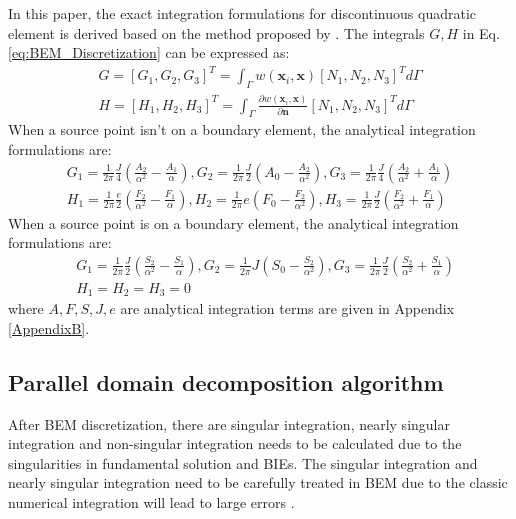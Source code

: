 \documentclass[num-refs]{wiley-networks}
\begin{document}
In this paper, the exact integration formulations for discontinuous quadratic element is derived based on the method proposed by \cite{zhang2003exact}. The integrals $G,H$ in Eq.\eqref{eq:BEM_Discretization} can be expressed as:
\begin{eqnarray}
G=\left[ G_1,G_2,G_3 \right] ^T=\int_{\Gamma}{w\left( \mathbf{x}_i,\mathbf{x} \right)}\left[ N_1,N_2,N_3 \right] ^Td\Gamma 
\\
H=\left[ H_1,H_2,H_3 \right] ^T=\int_{\Gamma}{\frac{\partial w\left( \mathbf{x}_i,\mathbf{x} \right)}{\partial \mathbf{n}}}\left[ N_1,N_2,N_3 \right] ^Td\Gamma 
\label{eq:BEM_Integrals}
\end{eqnarray}
When a source point isn't on a boundary element, the analytical integration formulations are:
\begin{eqnarray}
    G_1=\frac{1}{2\pi}\frac{J}{4}\left( \frac{A_2}{\alpha ^2}-\frac{A_1}{\alpha} \right) , G_2=\frac{1}{2\pi}\frac{J}{2}\left( A_0-\frac{A_2}{\alpha ^2} \right) ,G_3=\frac{1}{2\pi}\frac{J}{4}\left( \frac{A_2}{\alpha ^2}+\frac{A_1}{\alpha} \right) 
    \\
    H_1=\frac{1}{2\pi}\frac{e}{2}\left( \frac{F_2}{\alpha ^2}-\frac{F_1}{\alpha} \right) , H_2=\frac{1}{2\pi}e\left( F_0-\frac{F_2}{\alpha ^2} \right) ,H_3=\frac{1}{2\pi}\frac{J}{2}\left( \frac{F_2}{\alpha ^2}+\frac{F_1}{\alpha} \right) 
\label{eq:BEM_ExactInt1}
\end{eqnarray}
When a source point is on a boundary element, the analytical integration formulations are:
\begin{eqnarray}
    &G_1=\frac{1}{2\pi}\frac{J}{2}\left( \frac{S_2}{\alpha ^2}-\frac{S_1}{\alpha} \right) ,G_2=\frac{1}{2\pi}J\left( S_0-\frac{S_2}{\alpha ^2} \right) ,G_3=\frac{1}{2\pi}\frac{J}{2}\left( \frac{S_2}{\alpha ^2}+\frac{S_1}{\alpha} \right) 
    \\
    &H_1=H_2=H_3=0
\label{eq:BEM_ExactInt2}
\end{eqnarray}
where $A,F,S,J,e$ are analytical integration terms are given in Appendix \ref{AppendixB}. 

\subsection{Parallel domain decomposition algorithm}
After BEM discretization, there are singular integration, nearly singular integration and non-singular integration needs to be calculated due to the singularities in fundamental solution and BIEs. The singular integration and nearly singular integration need to be carefully treated in BEM due to the classic numerical integration will lead to large errors \cite{katsikadelisBook2016}.
\end{document}
